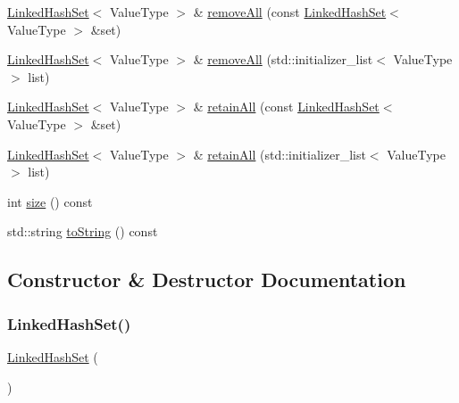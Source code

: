 \begin{DoxyCompactItemize}
\item 
\mbox{\hyperlink{classLinkedHashSet}{Linked\+Hash\+Set}}$<$ Value\+Type $>$ \& \mbox{\hyperlink{classLinkedHashSet_a0f6c00ad546a16426d687412d8ed0854}{remove\+All}} (const \mbox{\hyperlink{classLinkedHashSet}{Linked\+Hash\+Set}}$<$ Value\+Type $>$ \&set)
\item 
\mbox{\hyperlink{classLinkedHashSet}{Linked\+Hash\+Set}}$<$ Value\+Type $>$ \& \mbox{\hyperlink{classLinkedHashSet_ac1892347c21e036d81fe91d03d644925}{remove\+All}} (std\+::initializer\+\_\+list$<$ Value\+Type $>$ list)
\item 
\mbox{\hyperlink{classLinkedHashSet}{Linked\+Hash\+Set}}$<$ Value\+Type $>$ \& \mbox{\hyperlink{classLinkedHashSet_aa2107a246d515845118008684fcdf7dc}{retain\+All}} (const \mbox{\hyperlink{classLinkedHashSet}{Linked\+Hash\+Set}}$<$ Value\+Type $>$ \&set)
\item 
\mbox{\hyperlink{classLinkedHashSet}{Linked\+Hash\+Set}}$<$ Value\+Type $>$ \& \mbox{\hyperlink{classLinkedHashSet_abad19033b865e419b55ff11ab38cd8e3}{retain\+All}} (std\+::initializer\+\_\+list$<$ Value\+Type $>$ list)
\item 
int \mbox{\hyperlink{classLinkedHashSet_af9593d4a5ff4274efaf429cb4f9e57cc}{size}} () const
\item 
std\+::string \mbox{\hyperlink{classLinkedHashSet_a1fe5121d6528fdea3f243321b3fa3a49}{to\+String}} () const
\end{DoxyCompactItemize}


\subsection{Constructor \& Destructor Documentation}
\mbox{\label{classLinkedHashSet_ac0b98631ae20907b02a2cd67b3bf8962}} 
\subsubsection{\texorpdfstring{Linked\+Hash\+Set()}{LinkedHashSet()}\hspace{0.1cm}{\footnotesize\ttfamily [1/2]}}
{\footnotesize\ttfamily \mbox{\hyperlink{classLinkedHashSet}{Linked\+Hash\+Set}} (\begin{DoxyParamCaption}{ }\end{DoxyParamCaption})}

